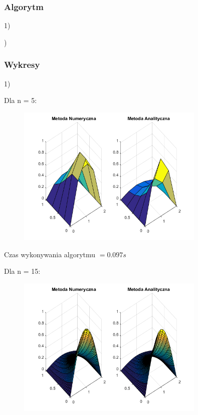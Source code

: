 \newpage

\subsubsection{Algorytm}
1)

)

\newpage
\subsubsection{Wykresy}
1)

Dla n = 5:

\begin{figure}[!ht]
	\begin{center}
		\includegraphics[width=0.8\textwidth]{Lab7/charts/rm/5.png}
	\end{center}
\end{figure}

Czas wykonywania algorytmu $ = 0.097 s$

Dla n = 15:

\begin{figure}[!ht]
	\begin{center}
		\includegraphics[width=0.8\textwidth]{Lab7/charts/rm/15.png}
	\end{center}
\end{figure}

